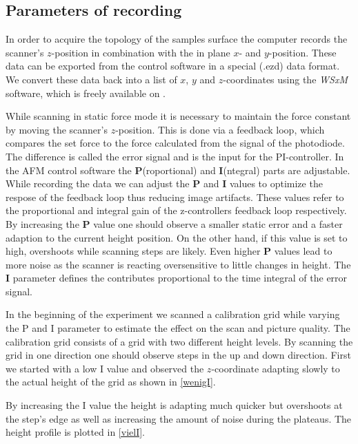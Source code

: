 \documentclass[paper=a4,fontsize=10pt,DIV=18,twocolumn,parskip=half]{scrartcl}
\numberwithin{equation}{section}    %
\begin{document}
\subsection{Parameters of recording}
In order to acquire the topology of the samples surface the computer records the 
scanner's $z$-position in combination with the in plane $x$- and $y$-position. 
These data can be exported from the control software in a special (.ezd) data 
format. We convert these data back into a list of $x$, $y$ and $z$-coordinates 
using the \textit{WSxM} software, which is freely available on \cite{nanotec}. 

While scanning in static force mode it is necessary to maintain the force 
constant by moving the scanner's $z$-position. This is done via a feedback loop, 
which compares the set force to the force calculated from the signal of the 
photodiode. The difference is called the error signal and is the input for the 
PI-controller. In the AFM control software the \textbf{P}(roportional) and 
\textbf{I}(ntegral) parts are adjustable.  While recording the data we can 
adjust the \textbf{P} and \textbf{I} values to optimize the respose of the 
feedback loop thus reducing image artifacts.  These values refer to the 
proportional and integral gain of the z-controllers feedback loop respectively. 
By increasing the \textbf{P} value one should observe a smaller static error and 
a faster adaption to the current height position. On the other hand, if this 
value is set to high, overshoots while scanning steps are likely. Even higher 
\textbf{P} values lead to more noise as the scanner is reacting oversensitive to little 
changes in height. The \textbf{I} parameter defines the contributes proportional 
to the time integral of the error signal. 

In the beginning of the experiment we scanned a calibration grid while varying 
the P and I parameter to estimate the effect on the scan and picture quality.  
The calibration grid consists of a grid with two different height levels. By 
scanning the grid in one direction one should observe steps in the up and down 
direction. First we started with a low I value and observed the $z$-coordinate 
adapting slowly to the actual height of the grid as shown in \ref{wenigI}.

By increasing the I value the height is adapting much quicker but overshoots at 
the step's edge as well as increasing the amount of noise during the plateaus. 
The height profile is plotted in \ref{vielI}.
\end{document}
